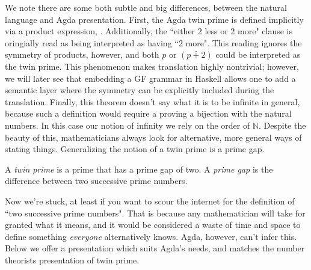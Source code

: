 We note there are some both subtle and big differences, between the natural
language and Agda presentation. First, the Agda twin prime is defined implicitly
via a product expression, . Additionally, the ``either 2 less or 2 more"
clause is oringially read as being interpreted as having ``2 more". This reading
ignores the symmetry of products, however, and both $p$ or $(p ∔ 2)$ could be
interpreted as the twin prime. This phenomenon makes translation highly
nontrivial; however, we will later see that embedding a GF grammar in Haskell
allows one to add a semantic layer where the symmetry can be explicitly included
during the translation. Finally, this theorem doesn't say what it is to be
infinite in general, because such a definition would require a proving a
bijection with the natural numbers. In this case our notion of infinity we rely
on the order of $ℕ$. Despite the beauty of this, mathematicians always look for
alternative, more general ways of stating things. Generalizing the notion of a
twin prime is a prime gap.

\begin{definition}\label{def:def11}
A \emph{twin prime} is a prime that has a prime gap of two.
A \emph{prime gap} is the difference between two successive prime numbers.
\end{definition}

Now we're stuck, at least if you want to scour the internet for the definition
of ``two successive prime numbers". That is because any mathematician will take
for granted what it means, and it would be considered a waste of time and space
to define something \emph{everyone} alternatively knows. Agda, however, can't
infer this. Below we offer a presentation which suits Agda's needs, and matches
the number theorists presentation of twin prime.

